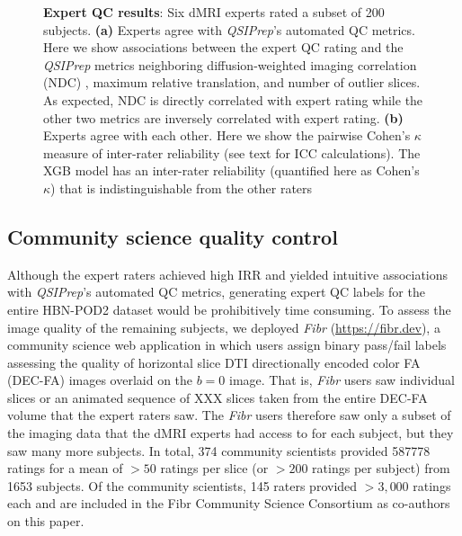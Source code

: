\documentclass[fleqn,10pt]{wlscirep}
\begin{document}
\begin{figure}[ht]
\begin{subfigure}{.5\textwidth}
    \caption{}
    \label{fig:expert-qc:irr}
    \end{subfigure}
    \caption{%
        {\bf Expert QC results}:
        Six dMRI experts rated a subset of \num{200} subjects.
        \textbf{(a)} Experts agree with \emph{QSIPrep}'s automated QC metrics.
        Here we show associations between the expert QC rating and the
        \emph{QSIPrep} metrics neighboring diffusion-weighted imaging
        correlation (NDC) \cite{yeh2019-kb}, maximum relative translation, and
        number of outlier slices. As expected, NDC is directly correlated with expert rating while
        the other two metrics are inversely correlated with expert rating.
        \textbf{(b)} Experts agree with each other. Here we show the pairwise
        Cohen's $\kappa$ measure of inter-rater reliability (see text for ICC
        calculations). The XGB model has an inter-rater reliability (quantified
        here as Cohen's $\kappa$) that is indistinguishable from the other
        raters
    }
    \label{fig:expert-qc}
\end{figure}

\subsection*{Community science quality control}

Although the expert raters achieved high IRR and yielded intuitive associations
with \emph{QSIPrep}'s automated QC metrics, generating expert QC labels for the
entire HBN-POD2 dataset would be prohibitively time consuming. To assess the
image quality of the remaining subjects, we deployed \emph{Fibr}
(\url{https://fibr.dev}), a community science web application in which users
assign binary pass/fail labels assessing the quality of horizontal slice DTI
directionally encoded color FA (DEC-FA) images overlaid on the $b=0$ image. That
is, \emph{Fibr} users saw individual slices or an animated sequence of XXX
slices taken from the entire DEC-FA volume that the expert raters saw. The
\emph{Fibr} users therefore saw only a subset of the imaging data that the dMRI
experts had access to for each subject, but they saw many more subjects. In
total, \num{374} community scientists provided \num{587778} ratings for a mean
of $>50$ ratings per slice (or $>200$ ratings per subject) from \num{1653}
subjects. Of the community scientists, \num{145} raters provided $>3,000$
ratings each and are included in the Fibr Community Science Consortium as
co-authors on this paper.
\end{document}

